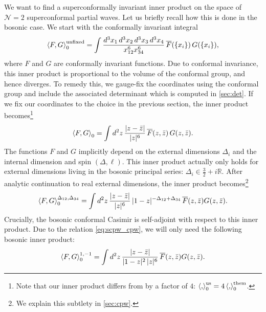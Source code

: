 \documentclass[11pt]{article}
\newcommand{\zb}{\bar{z}}
\begin{document}
We want to find a superconformally invariant inner product on the space of $\mathcal{N}=2$ superconformal partial waves.   Let us briefly recall how this is done in the bosonic case. We start with the conformally invariant integral
%
\begin{equation}\label{eq:bosip_unfixed}
\expval{ F,G }_{0}^{\mathrm{unfixed}} = \int \frac{d^{3}x_{1}\,d^{3}x_{2}\,d^{3}x_{3}\,d^{3}x_{4}}{x_{12}^{6}x_{34}^{6}}\,\overline{F}(\{x_{i}\}) \, G(\{x_{i}\}),
\end{equation}
%
where $F$ and $G$ are conformally invariant functions. Due to conformal invariance, this inner product is proportional to the volume of the conformal group, and hence diverges. To remedy this, we gauge-fix the coordinates using the conformal group and include the associated determinant which is computed in \cref{sec:det}. If we fix our coordinates to the choice in the previous section, the inner product becomes\footnote{Note that our inner product differs from \cite{Simmons-Duffin:2017nub} by a factor of $4$: $\expval{,}_{0}^{\mathrm{us}} = 4\expval{,}_{0}^{\mathrm{them}}$.}
%
\begin{equation}\label{eq:bosip}
\expval{ F,G }_{0} = \int d^{2}z\,\frac{|z-\zb|}{|z|^{6}}\,\overline{F}(z,\zb)\,G(z,\zb).
\end{equation}
%
The functions $F$ and $G$ implicitly depend on the external dimensions $\Delta_{i}$ and the internal dimension and spin $(\Delta,\ell)$. This inner product actually only holds for external dimensions living in the bosonic principal series: $\Delta_{i} \in \frac{3}{2}+i\mathbb{R}$. After analytic continuation to real external dimensions, the inner product becomes\footnote{We explain this subtlety in \cref{sec:cpw}. }
%
\begin{equation}\label{eq:bosip_realext}
\expval{ F,G }_{0}^{\Delta_{12},\Delta_{34}} = \int d^{2}z\,\frac{|z-\zb|}{|z|^{6}} \, |1-z|^{-\Delta_{12}+\Delta_{34}}\,\overline{F}(z,\zb)G(z,\zb).
\end{equation}
%
Crucially, the bosonic conformal Casimir is self-adjoint with respect to this inner product. Due to the relation \eqref{eq:scpw_cpw}, we will only need the following bosonic inner product:
\begin{equation}\label{eq:bosip_1,-1}
\expval{ F,G }_{0}^{1,-1} = \int d^{2}z\,\frac{|z-\zb|}{|1-z|^{2} \, |z|^{6}}\,\overline{F}(z,\zb)G(z,\zb).
\end{equation}
\end{document}
